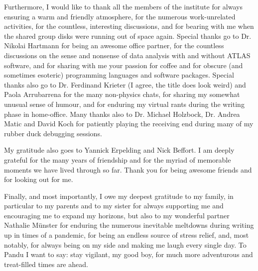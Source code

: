 \begin{acknowledgements}[Acknowledgements]
Furthermore, I would like to thank all the members of the institute for always ensuring a warm and friendly atmosphere, for the numerous work-unrelated activities, for the countless, interesting discussions, and for bearing with me when the shared group disks were running out of space again.
Special thanks go to Dr.\@\xspace Nikolai Hartmann for being an awesome office partner, for the countless discussions on the sense and nonsense of data analysis with and without ATLAS software, and for sharing with me your passion for coffee and for obscure (and sometimes esoteric) programming languages and software packages.
Special thanks also go to Dr.\@\xspace Ferdinand Krieter (I agree, the title does look weird) and Paola Arrubarrena for the many non-physics chats, for sharing my somewhat unusual sense of humour, and for enduring my virtual rants during the writing phase in home-office.
Many thanks also to Dr.\@\xspace Michael Holzbock, Dr.\@\xspace Andrea Matic and David Koch for patiently playing the receiving end during many of my rubber duck debugging sessions. 

My gratitude also goes to Yannick Erpelding and Nick Beffort. I am deeply grateful for the many years of friendship and for the myriad of memorable moments we have lived through so far. Thank you for being awesome friends and for looking out for me.

Finally, and most importantly, I owe my deepest gratitude to my family, in particular to my parents and to my sister for always supporting me and encouraging me to expand my horizons, but also to my wonderful partner Nathalie M\"unster for enduring the numerous inevitable meltdowns during writing up in times of a pandemic, for being an endless source of stress relief, and, most notably, for always being on my side and making me laugh every single day. To Pandu I want to say: stay vigilant, my good boy, for much more adventurous and treat-filled times are ahead.  

%
%
%


\end{acknowledgements}
